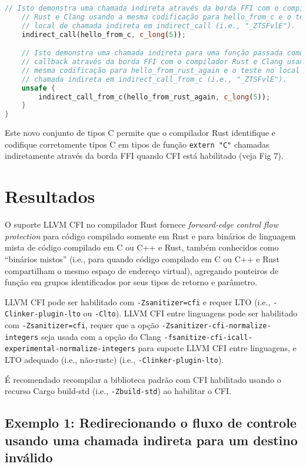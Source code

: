 \documentclass{article}
\begin{document}
\begin{lstlisting}[language=Rust, caption={Exemplo de programa Rust usando tipos inteiros Rust e a codificação do compilador Rust com os tipos da crate cfi\_types.}]
    // Isto demonstra uma chamada indireta através da borda FFI com o compilador
    // Rust e Clang usando a mesma codificação para hello_from_c e o teste no
    // local de chamada indireta em indirect_call (i.e., "_ZTSFvlE").
    indirect_call(hello_from_c, c_long(5));

    // Isto demonstra uma chamada indireta para uma função passada como uma
    // callback através da borda FFI com o compilador Rust e Clang usando a
    // mesma codificação para hello_from_rust_again e o teste no local de
    // chamada indireta em indirect_call_from_c (i.e., "_ZTSFvlE").
    unsafe {
        indirect_call_from_c(hello_from_rust_again, c_long(5));
    }
}
\end{lstlisting}

Este novo conjunto de tipos C permite que o compilador Rust identifique e codifique corretamente tipos C em tipos de função \texttt{extern "C"} chamadas indiretamente através da borda FFI quando CFI está habilitado (veja Fig 7).


\section{Resultados}

O suporte LLVM CFI no compilador Rust fornece \textit{forward-edge control flow protection} para código compilado somente em Rust e para binários de linguagem mista de código compilado em C ou C++ e Rust, também conhecidos como “binários mistos” (i.e., para quando código compilado em C ou C++ e Rust compartilham o mesmo espaço de endereço virtual), agregando ponteiros de função em grupos identificados por seus tipos de retorno e parâmetro.

LLVM CFI pode ser habilitado com \texttt{-Zsanitizer=cfi} e requer LTO (i.e., \texttt{-Clinker-plugin-lto} ou \texttt{-Clto}). LLVM CFI entre linguagens pode ser habilitado com \texttt{-Zsanitizer=cfi}, requer que a opção \texttt{-Zsanitizer-cfi-normalize-integers} seja usada com a opção do Clang \texttt{-fsanitize-cfi-icall-experimental-normalize-integers} para suporte LLVM CFI entre linguagens, e LTO adequado (i.e., não-rustc) (i.e., \texttt{-Clinker-plugin-lto}).

É recomendado recompilar a biblioteca padrão com CFI habilitado usando o recurso Cargo build-std (i.e., \texttt{-Zbuild-std}) ao habilitar o CFI.


\subsection{Exemplo 1: Redirecionando o fluxo de controle usando uma chamada indireta para um destino inválido}
\end{document}
